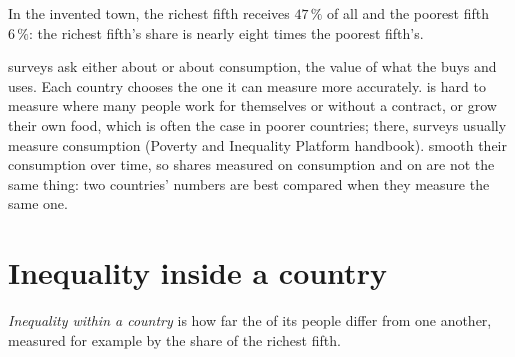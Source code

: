 In the invented town, the richest fifth receives $47\,\%$ of all  and the poorest fifth $6\,\%$: the
richest fifth's share is nearly eight times the poorest fifth's.

\begin{measure}
 surveys ask either about  or about consumption, the value of what the  buys and
uses. Each country chooses the one it can measure more accurately.  is hard to measure where many
people work for themselves or without a contract, or grow their own food, which is often the case in poorer
countries; there, surveys usually measure consumption (Poverty and Inequality Platform handbook). 
smooth their consumption over time, so shares measured on consumption and on  are not the same
thing: two countries' numbers are best compared when they measure the same one.
\end{measure}

\section{Inequality inside a country}

\begin{definition}\label{def:g9:income-distribution:within}
\emph{Inequality within a country} is how far the  of its people
differ from one another, measured for example by the  share of the richest fifth.
\end{definition}

